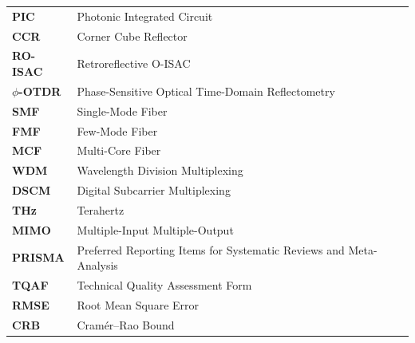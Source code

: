 \begin{table}[!t]
\begin{tabularx}{\columnwidth}{@{}>{\raggedright\arraybackslash}p{}>{\raggedright\arraybackslash}X@{}}
        \textbf{PIC}         & Photonic Integrated Circuit                                        \\
        \textbf{CCR}         & Corner Cube Reflector                                              \\
        \textbf{RO-ISAC}     & Retroreflective O-ISAC                                             \\
        \textbf{$\phi$-OTDR} & Phase-Sensitive Optical Time-Domain Reflectometry                  \\
        \textbf{SMF}         & Single-Mode Fiber                                                  \\
        \textbf{FMF}         & Few-Mode Fiber                                                     \\
        \textbf{MCF}         & Multi-Core Fiber                                                   \\
        \textbf{WDM}         & Wavelength Division Multiplexing                                   \\
        \textbf{DSCM}        & Digital Subcarrier Multiplexing                                    \\
        \textbf{THz}         & Terahertz                                                          \\
        \textbf{MIMO}        & Multiple-Input Multiple-Output                                     \\
        \textbf{PRISMA}      & Preferred Reporting Items for Systematic Reviews and Meta-Analysis \\
        \textbf{TQAF}        & Technical Quality Assessment Form                                  \\
        \textbf{RMSE}        & Root Mean Square Error                                             \\
        \textbf{CRB}         & Cram\'er--Rao Bound                                                \\
        \bottomrule
    \end{tabularx}
\end{table}

